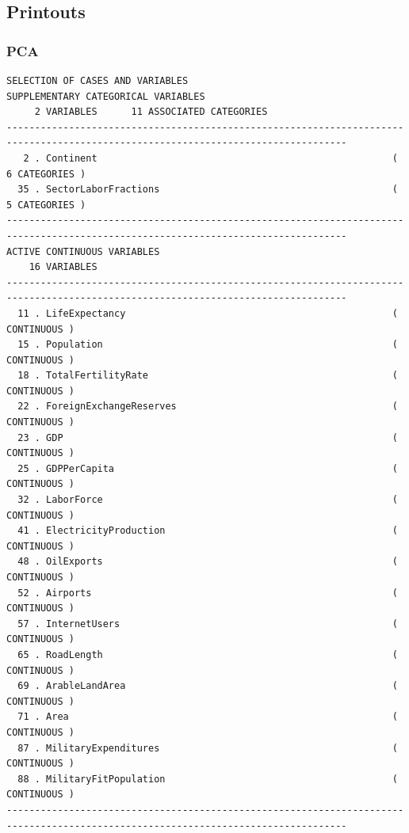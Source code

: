\documentclass[a4paper,10pt,twocolumn]{article}
\begin{document}
\newpage
\begin{landscape}
\subsection{Printouts}
\subsubsection{PCA}\label{pca}
\begin{verbatim}
SELECTION OF CASES AND VARIABLES
SUPPLEMENTARY CATEGORICAL VARIABLES
     2 VARIABLES      11 ASSOCIATED CATEGORIES
----------------------------------------------------------------------------------------------------------------------------------
   2 . Continent                                                    (   6 CATEGORIES )
  35 . SectorLaborFractions                                         (   5 CATEGORIES )
----------------------------------------------------------------------------------------------------------------------------------
ACTIVE CONTINUOUS VARIABLES
    16 VARIABLES
----------------------------------------------------------------------------------------------------------------------------------
  11 . LifeExpectancy                                               ( CONTINUOUS )
  15 . Population                                                   ( CONTINUOUS )
  18 . TotalFertilityRate                                           ( CONTINUOUS )
  22 . ForeignExchangeReserves                                      ( CONTINUOUS )
  23 . GDP                                                          ( CONTINUOUS )
  25 . GDPPerCapita                                                 ( CONTINUOUS )
  32 . LaborForce                                                   ( CONTINUOUS )
  41 . ElectricityProduction                                        ( CONTINUOUS )
  48 . OilExports                                                   ( CONTINUOUS )
  52 . Airports                                                     ( CONTINUOUS )
  57 . InternetUsers                                                ( CONTINUOUS )
  65 . RoadLength                                                   ( CONTINUOUS )
  69 . ArableLandArea                                               ( CONTINUOUS )
  71 . Area                                                         ( CONTINUOUS )
  87 . MilitaryExpenditures                                         ( CONTINUOUS )
  88 . MilitaryFitPopulation                                        ( CONTINUOUS )
----------------------------------------------------------------------------------------------------------------------------------

\end{verbatim}
\end{landscape}
\end{document}
